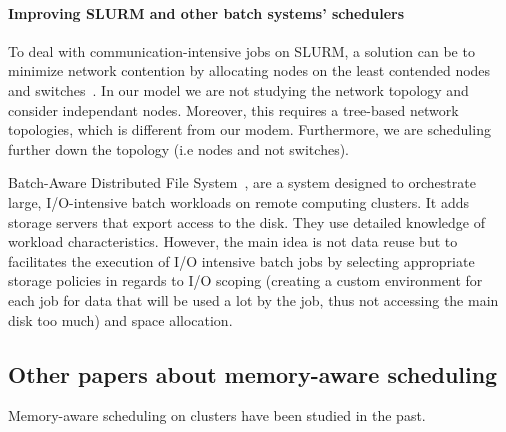 \documentclass[conference,10pt]{IEEEtran}
\begin{document}
\paragraph{Improving SLURM and other batch systems' schedulers}

To deal with communication-intensive jobs on SLURM, a solution can be to
minimize network contention by allocating nodes on the least
contended nodes and switches~\cite{minimize_network_contention}. 
In our model we are not studying the network topology and consider independant nodes.
Moreover, this requires a tree-based network topologies, which is different from our modem.
Furthermore, we are scheduling further down the topology (i.e nodes and not switches).

Batch-Aware Distributed File System~\cite{Explicit_Control_in_a_Batch-Aware_Distributed_File_System},
are a system designed to orchestrate large, I/O-intensive batch workloads on remote computing clusters.
It adds storage servers that export access to the disk.
They use detailed knowledge of workload characteristics.
However, the main idea is not data reuse but to
facilitates the execution of I/O intensive batch
jobs by selecting appropriate storage policies
in regards to I/O scoping (creating a custom environment for each job
for data that will be used a lot by the job, thus not accessing the main disk too
much) and space allocation.


\subsection{Other papers about memory-aware scheduling}
Memory-aware scheduling on clusters have been studied in the past.
 
\end{document}
